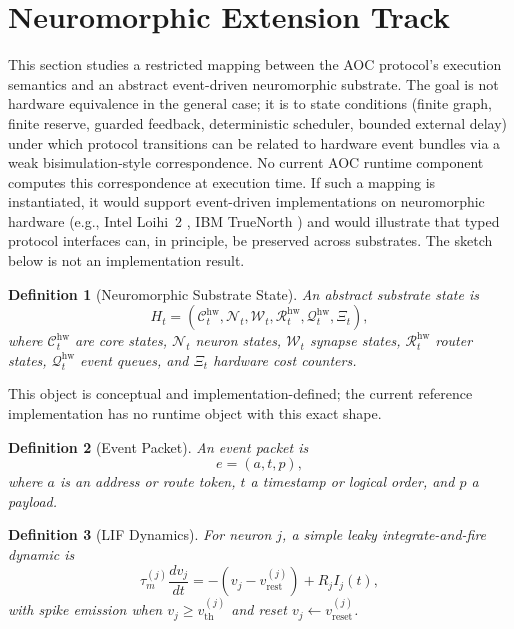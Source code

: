 \documentclass[11pt]{article}
\newtheorem{definition}{Definition}[section]
\theoremstyle{remark}
\newcommand{\AOC}{\textup{\textsc{AOC}}}
\begin{document}
\section{Neuromorphic Extension Track}\label{sec:neuromorphic-extension}

This section studies a restricted mapping between the \AOC{} protocol's execution semantics and an abstract event-driven neuromorphic substrate.
The goal is not hardware equivalence in the general case; it is to state conditions (finite graph, finite reserve, guarded feedback, deterministic scheduler, bounded external delay) under which protocol transitions can be related to hardware event bundles via a weak bisimulation-style correspondence. No current \AOC{} runtime component computes this correspondence at execution time.
If such a mapping is instantiated, it would support event-driven implementations on neuromorphic hardware (e.g., Intel Loihi~2 \cite{intelloihi2}, IBM TrueNorth \cite{ibmtruenorth}) and would illustrate that typed protocol interfaces can, in principle, be preserved across substrates. The sketch below is not an implementation result.

\begin{definition}[Neuromorphic Substrate State]
An abstract substrate state is
\[
H_t=(\mathcal{C}^{\mathrm{hw}}_t,\mathcal{N}_t,\mathcal{W}_t,\mathcal{R}^{\mathrm{hw}}_t,\mathcal{Q}^{\mathrm{hw}}_t,\Xi_t),
\]
where \(\mathcal{C}^{\mathrm{hw}}_t\) are core states, \(\mathcal{N}_t\) neuron states, \(\mathcal{W}_t\) synapse states, \(\mathcal{R}^{\mathrm{hw}}_t\) router states, \(\mathcal{Q}^{\mathrm{hw}}_t\) event queues, and \(\Xi_t\) hardware cost counters.
\end{definition}
This object is conceptual and implementation-defined; the current reference implementation has no runtime object with this exact shape.

\begin{definition}[Event Packet]
An event packet is
\[
e=(a,t,p),
\]
where \(a\) is an address or route token, \(t\) a timestamp or logical order, and \(p\) a payload.
\end{definition}

\begin{definition}[LIF Dynamics]
For neuron \(j\), a simple leaky integrate-and-fire dynamic is
\[
\tau^{(j)}_m \frac{dv_j}{dt}=-(v_j-v^{(j)}_{\mathrm{rest}})+R_j I_j(t),
\]
with spike emission when \(v_j\ge v^{(j)}_{\mathrm{th}}\) and reset \(v_j\leftarrow v^{(j)}_{\mathrm{reset}}\).
\end{definition}
\end{document}
